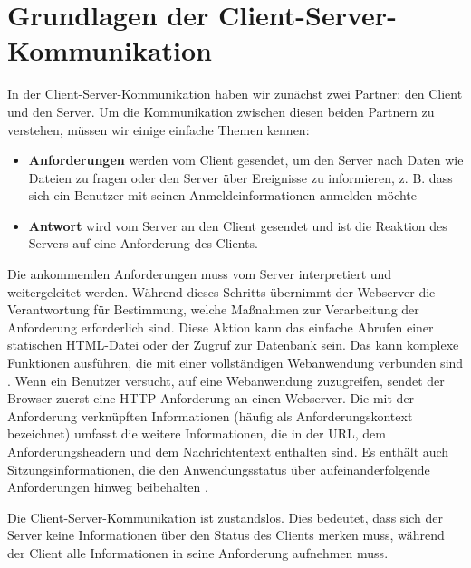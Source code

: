 \section{Grundlagen der Client-Server-Kommunikation}
\label{sec:theorie:api}
In der Client-Server-Kommunikation haben wir zunächst zwei Partner: den Client und den Server. Um die Kommunikation zwischen diesen beiden Partnern zu verstehen, müssen wir einige einfache Themen kennen:
\begin{itemize}
\item \textbf{Anforderungen} werden vom Client gesendet, um den Server nach Daten wie Dateien zu fragen oder den Server über Ereignisse zu informieren, z. B. dass sich ein Benutzer mit seinen Anmeldeinformationen anmelden möchte
\item \textbf{Antwort} wird vom Server an den Client gesendet und ist die Reaktion des Servers auf eine Anforderung des Clients. 
\end{itemize}

Die ankommenden Anforderungen muss vom Server interpretiert und weitergeleitet werden. Während dieses Schritts übernimmt der Webserver die Verantwortung für Bestimmung, welche Maßnahmen zur Verarbeitung der Anforderung erforderlich sind. Diese Aktion kann das einfache Abrufen einer statischen HTML-Datei oder der Zugruf zur Datenbank sein. Das kann komplexe Funktionen ausführen, die mit einer vollständigen Webanwendung verbunden sind \cite[p.204]{shklar:webapplication}. Wenn ein Benutzer versucht, auf eine Webanwendung zuzugreifen, sendet der Browser zuerst eine HTTP-Anforderung an einen Webserver. Die mit der Anforderung verknüpften Informationen (häufig als Anforderungskontext bezeichnet) umfasst die weitere Informationen, die in der URL, dem Anforderungsheadern und dem Nachrichtentext enthalten sind. Es enthält auch Sitzungsinformationen, die den Anwendungsstatus über aufeinanderfolgende Anforderungen hinweg beibehalten \cite[p.205]{shklar:webapplication}.

Die Client-Server-Kommunikation ist zustandslos. Dies bedeutet, dass sich der Server keine Informationen über den Status des Clients merken muss, während der Client alle Informationen in seine Anforderung aufnehmen muss.

